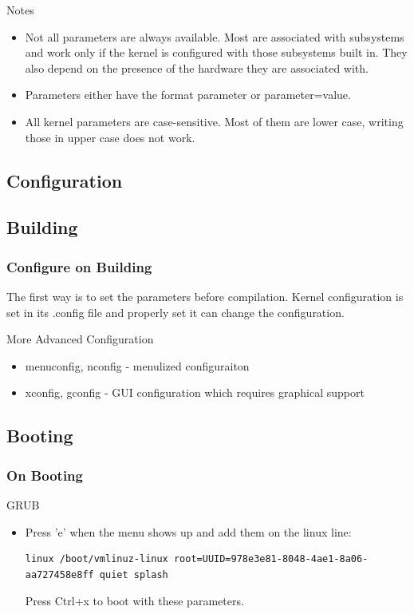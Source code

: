 \documentclass{beamer}
\begin{document}
\begin{frame}{Notes}
    \begin{itemize}
        \item Not all parameters are always available. Most are associated with subsystems and work only if the kernel is configured with those subsystems built in. They also depend on the presence of the hardware they are associated with.
\\
\item Parameters either have the format parameter or parameter=value.
\\
 \item All kernel parameters are case-sensitive. Most of them are lower case, writing those in upper case does not work.
    \end{itemize}

\end{frame}

\begin{frame}
    \section{Configuration}
    \subsection{Building}
    \frametitle{Configure on Building}
    The first way is to set the parameters before compilation. Kernel configuration is set in its {\color{blue} .config} file and properly set it can change the configuration.

    \begin{block}{More Advanced Configuration}
        \begin{itemize}
            \item menuconfig, nconfig - menulized configuraiton
            \item xconfig, gconfig - GUI configuration which requires graphical support
        \end{itemize}
    \end{block}

\end{frame}

\begin{frame}[fragile]
	\subsection{Booting}
	\frametitle{On Booting}
	\begin{block}{GRUB}
	 \begin{itemize}
       \item Press 'e' when the menu shows up and add them on the linux line:
       \begin{lstlisting}
linux /boot/vmlinuz-linux root=UUID=978e3e81-8048-4ae1-8a06-aa727458e8ff quiet splash
       \end{lstlisting}
       Press Ctrl+x to boot with these parameters.
     \end{itemize}
	\end{block}
	
\end{frame}
\end{document}
